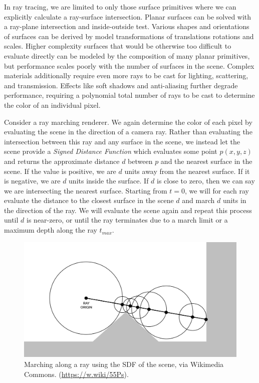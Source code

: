 \documentclass[sigconf, nonacm]{acmart}
\begin{document}
In ray tracing, we are limited to only those surface primitives where we can explicitly calculate a ray-surface intersection. Planar surfaces can be solved with a ray-plane intersection and inside-outside test. Various shapes and orientations of surfaces can be derived by model transformations of translations rotations and scales. Higher complexity surfaces that would be otherwise too difficult to evaluate directly can be modeled by the composition of many planar primitives, but performance scales poorly with the number of surfaces in the scene. Complex materials additionally require even more rays to be cast for lighting, scattering, and transmission. Effects like soft shadows and anti-aliasing further degrade performance, requiring a polynomial total number of rays to be cast to determine the color of an individual pixel.

Consider a ray marching renderer. We again determine the color of each pixel by evaluating the scene in the direction of a camera ray. Rather than evaluating the intersection between this ray and any surface in the scene, we instead let the scene provide a \textit{Signed Distance Function} which evaluates some point $p(x,y,z)$ and returns the approximate distance $d$ between $p$ and the nearest surface in the scene. If the value is positive, we are $d$ units away from the nearest surface. If it is negative, we are $d$ units inside the surface. If $d$ is close to zero, then we can say we are intersecting the nearest surface. Starting from $t = 0$, we will for each ray evaluate the distance to the closest surface in the scene $d$ and march $d$ units in the direction of the ray. We will evaluate the scene again and repeat this process until $d$ is near-zero, or until the ray terminates due to a march limit or a maximum depth along the ray $t_{max}$.

\begin{figure}[h]
  \centering
  \includegraphics[width=0.6\linewidth]{images/Visualization_of_SDF.png}
  \caption{Marching along a ray using the SDF of the scene, via Wikimedia
    Commons. (\url{https://w.wiki/55Ps}).}
\end{figure}
\end{document}

